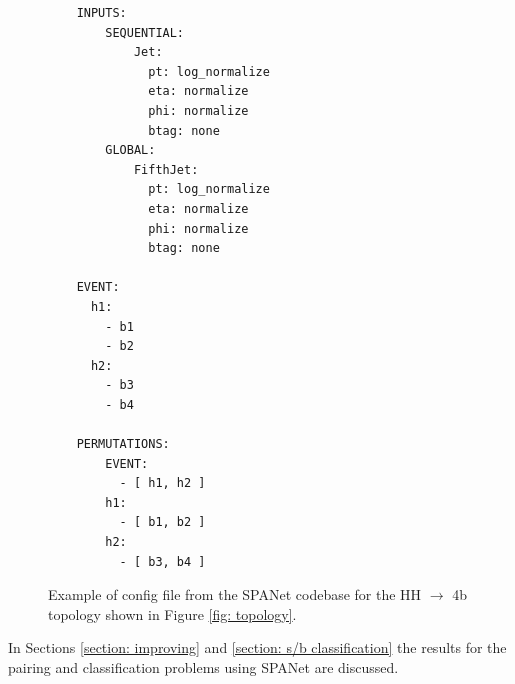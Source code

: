 \begin{figure}[hbt]
    \centering
    \begin{verbatim}
    INPUTS:
        SEQUENTIAL:
            Jet:
              pt: log_normalize
              eta: normalize
              phi: normalize
              btag: none
        GLOBAL:
            FifthJet:
              pt: log_normalize
              eta: normalize
              phi: normalize
              btag: none

    EVENT:
      h1:
        - b1
        - b2
      h2:
        - b3
        - b4

    PERMUTATIONS:
        EVENT:
          - [ h1, h2 ]
        h1:
          - [ b1, b2 ]
        h2:
          - [ b3, b4 ]
\end{verbatim}
    \caption{Example of config file from the SPANet codebase for the HH $\to$ 4b topology shown in Figure \ref{fig: topology}.}
    \label{fig: config}
\end{figure}

In Sections \ref{section: improving} and \ref{section: s/b classification} the results for the pairing and classification problems using SPANet are discussed. 